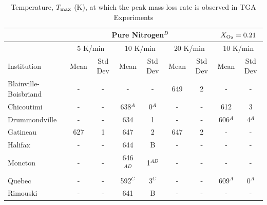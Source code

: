 \documentclass{book}
\begin{document}
\begin{table}[p]
\caption{Temperature, $T_{\rm max}$ (K), at which the peak mass loss rate is observed in TGA Experiments}
\label{Table_9}
\begin{center}
\begin{tabular}{|l|cc|cc|cc|cc|}
\hline
                        & \multicolumn{6}{|c|}{Pure Nitrogen$^D$} & \multicolumn{2}{|c|}{$X_{\rm O_2}=0.21$}                                                       \\  \hline
                        & \multicolumn{2}{|c|}{5 K/min} & \multicolumn{2}{|c|}{10 K/min}    & \multicolumn{2}{|c|}{20 K/min} & \multicolumn{2}{|c|}{10 K/min}      \\  \hline
Institution             & Mean        & Std Dev         & Mean           & Std Dev          & Mean       & Std Dev           & Mean        & Std Dev               \\  \hline
Blainville-Boisbriand   & -           & -               & -              & -                & 649        & 2                 & -           & -                     \\
Chicoutimi              & -           & -               & 638$^A$        & 0$^A$            & -          & -                 & 612         & 3                     \\
Drummondville           & -           & -               & 634            & 1                & -          & -                 & 606$^A$     & 4$^A$                 \\
Gatineau                & 627         & 1               & 647            & 2                & 647        & 2                 & -           & -                     \\
Halifax                 & -           & -               & 644            & B                & -          & -                 & -           & -                     \\
Moncton                 & -           & -               & 646$^{AD}$     & 1$^{AD}$         & -          & -                 & -           & -                     \\
Quebec                  & -           & -               & 592$^C$        & 3$^C$            & -          & -                 & 609$^A$     & 0$^A$                 \\
Rimouski                & -           & -               & 641            & B                & -          & -                 & -           & -                     \\

\end{tabular}
\end{center}
\end{table}
\end{document}
